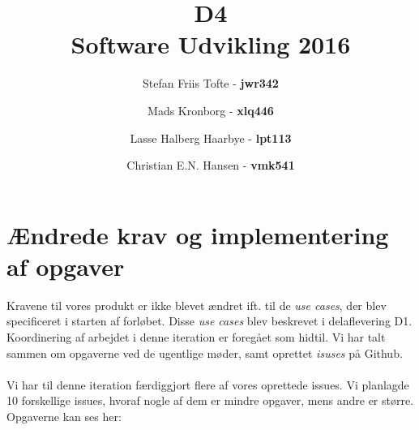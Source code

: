 \documentclass[11pt]{article}
\title{
  \vspace{3cm}
  \Huge{D4} \\
  \Large{Software Udvikling 2016}
}
\author{
	\Large{Stefan Friis Tofte} - \textbf{jwr342}%
	\and
	\Large{Mads Kronborg} - \textbf{xlq446}%
	\and
	\Large{Lasse Halberg Haarbye} - \textbf{lpt113}%
	\and
	\Large{Christian E.N. Hansen} - \textbf{vmk541}%
}
\def \ColourPDF {../include/ku-farve}
\def \TitlePDF {../include/ku-en}  %
\begin{document}


\clearpage\maketitle
\thispagestyle{empty}

\newpage
\tableofcontents
\newpage

\section{Ændrede krav og implementering af opgaver}
Kravene til vores produkt er ikke blevet ændret ift. til de \textit{use cases}, der blev specificeret i starten af forløbet. Disse \textit{use cases} blev beskrevet i delaflevering D1. \\
Koordinering af arbejdet i denne iteration er foregået som hidtil. Vi har talt sammen om opgaverne ved de ugentlige møder, samt oprettet \textit{isuses} på Github. \\ \\
Vi har til denne iteration færdiggjort flere af vores oprettede issues. Vi planlagde 10 forskellige issues, hvoraf nogle af dem er mindre opgaver, mens andre er større. Opgaverne kan ses her:
\end{document}
